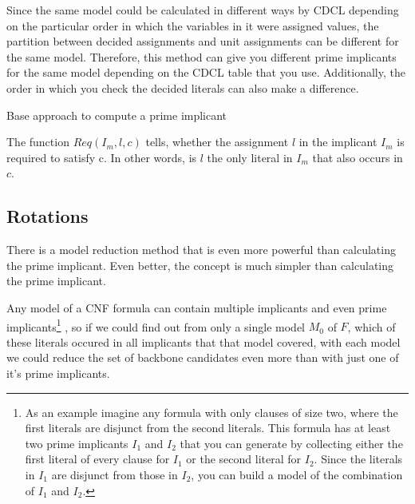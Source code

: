 Since the same model could be calculated in different ways by CDCL depending on the particular order in which the variables in it were assigned values, the partition between decided assignments and unit assignments can be different for the same model. Therefore, this method can give you different prime implicants for the same model depending on the CDCL table that you use. Additionally, the order in which you check the decided literals can also make a difference. 


\begin{algorithm}
\caption{{\sc Base approach to compute a prime implicant}}
\DontPrintSemicolon
{}

\;

\end{algorithm}

The function $Req(I_m,l,c)$ tells, whether the assignment $l$ in the implicant $I_m$ is required to satisfy c. In other words, is $l$ the only literal in $I_m$ that also occurs in $c$.

\subsection{Rotations}
\label{ss:rot}
There is a model reduction method that is even more powerful than calculating the prime implicant. Even better, the concept is much simpler than calculating the prime implicant. 

Any model of a CNF formula can contain multiple implicants and even prime implicants\footnote
	{As an example imagine any formula with only clauses of size two, where the first literals are disjunct from the second literals. This formula has at least two prime implicants $I_1$ and $I_2$ that you can generate by collecting either the first literal of every clause for $I_1$ or the second literal for $I_2$. Since the literals in $I_1$ are disjunct from those in $I_2$, you can build a model of the combination of $I_1$ and $I_2$.}
, so if we could find out from only a single model $M_0$ of $F$, which of these literals occured in all implicants that that model covered, with each model we could reduce the set of backbone candidates even more than with just one of it's prime implicants.

